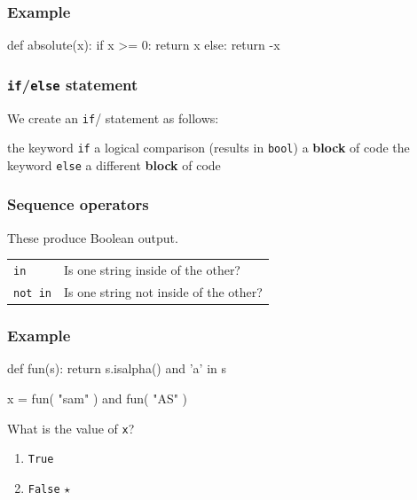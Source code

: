 \documentclass[11pt]{beamer}
\begin{document}
\begin{frame}[fragile]
  \frametitle{Example}
  \Enlarge

  \begin{semiverbatim}
def absolute(x):
    if x >= 0:
        return x
    else:
        return -x
  \end{semiverbatim}
\end{frame}

\begin{frame}[fragile]
  \frametitle{\texttt{if}/\texttt{else} statement}
  \Enlarge

  \begin{itemize}
  \myitem  We create an \texttt{if}/ statement as follows:
    \begin{itemize}
    \mysubitem  the keyword \texttt{if}
    \mysubitem  a logical comparison (results in \texttt{bool})
    \mysubitem  a \textbf{block} of code
    \mysubitem  the keyword \texttt{else}
    \mysubitem  a different \textbf{block} of code
    \end{itemize}
  \end{itemize}
\end{frame}

\begin{frame}[fragile]
  \frametitle{Sequence operators}
  \Enlarge

  \begin{itemize}
  \myitem  These produce Boolean output.
    \begin{tabular}{ll}
    \texttt{in}     & Is one string inside of the other? \\
    \texttt{not in} & Is one string not inside of the other?
    \end{tabular}
  \end{itemize}
\end{frame}

\begin{frame}[fragile]
  \frametitle{Example}
  \Enlarge

  \begin{semiverbatim}
def fun(s):
    return s.isalpha() and 'a' in s

x = fun( "sam" ) and fun( "AS" )
  \end{semiverbatim}
  What is the value of \texttt{x}?
  \begin{enumerate}[label=\Alph*]
  \item  \texttt{True}
  \item  \texttt{False}  $\star$
  \end{enumerate}
\end{frame}
\end{document}
